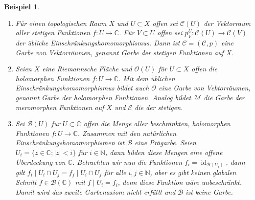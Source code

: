 \documentclass[11pt,a4paper,toc=bibliography]{scrartcl}
\theoremstyle{def}
\theoremstyle{thm}
\newtheorem{bsp}[defi]{Beispiel}
\theoremstyle{remark}
\DeclareMathOperator{\id}{id}
\begin{document}
\begin{bsp}

\begin{enumerate}
\item
Für einen topologischen Raum $X$ und $U\subset X$ offen sei $\mathcal{C}(U)$ der Vektorraum aller stetigen Funktionen $f:U\rightarrow \mathbb{C}$.
Für $V\subset U $ offen sei $p^U_V: \mathcal{C}(U)\rightarrow \mathcal{C}(V)$ der übliche Einschränkungshomomorphismus. Dann ist $\mathcal C = (\mathcal C,p)$ eine Garbe von Vektorräumen, genannt Garbe der stetigen Funktionen auf X.
\item
Seien $X$ eine Riemannsche Fläche und $\mathcal{O}(U)$ für $U\subset X$ offen die holomorphen Funktionen 
$f:U\rightarrow \mathbb{C}$. Mit dem üblichen Einschränkungshomomorphismus bildet auch $\mathcal{O}$ eine Garbe von Vektorräumen, genannt Garbe der holomorphen Funktionen.
Analog bildet $\mathcal{M}$ die Garbe der meromorphen Funktionen auf $X$ und $\mathcal{E}$ die der stetigen.
\item  Sei $\mathcal{B}(U) $  für $U\subset \mathbb{C}$  offen die Menge aller beschränkten, holomorphen Funktionen $f:U\rightarrow \mathbb{C}$. Zusammen mit den natürlichen Einschränkungshomomorphismen ist $ \mathcal{B}$ eine Prägarbe. Seien $U_i=\{ z\in\mathbb{C};|z|<i\}$ für $i\in\mathbb{N}$,  dann bilden diese Mengen eine offene Überdeckung von $\mathbb{C}$.  Betrachten wir nun die Funktionen $f_i = \id_{\mathcal{B}(U_i)}$,  dann gilt $f_i\mid U_i\cap U_j= f_j\mid U_i\cap U_j$ für alle $i,j\in \mathbb{N}$, aber es gibt keinen globalen Schnitt $f\in\mathcal{B}(\mathbb{C})$ mit $f\mid U_i = f_i$, denn diese Funktion wäre unbeschränkt. Damit wird das zweite Garbenaxiom nicht erfüllt und $\mathcal{B}$ ist keine Garbe.
\end{enumerate}


\end{bsp}
\end{document}
